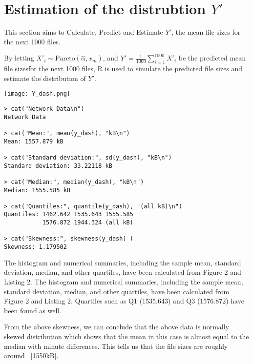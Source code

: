 \documentclass[11pt]{article}
\begin{document}
\section{Estimation of the distrubtion $Y'$}
This section aims to Calculate, Predict and Estimate $Y'$, the mean file sizes for the next 1000 files.
\par By letting $X'_{i}\sim\text{Pareto}(\hat{\alpha},x_m)$, and $Y' = \frac{1}{1000}\sum_{i=1}^{1000}X'_{i}$ be the predicted mean file sizesfor the next 1000 files,
R is used to simulate the predicted file sizes and estimate the distribution of $Y'$.\\
\begin{minipage}{0.4\textwidth}
    \centering
    \texttt{[image: Y\_dash.png]}
\end{minipage}%
\begin{minipage}{0.4\textwidth}
    \centering
    \footnotesize
    \begin{lstlisting}[caption={Summary \& Standard Deviation},captionpos=b]
> cat("Network Data\n")
Network Data

> cat("Mean:", mean(y_dash), "kB\n")
Mean: 1557.879 kB

> cat("Standard deviation:", sd(y_dash), "kB\n")
Standard deviation: 33.22118 kB

> cat("Median:", median(y_dash), "kB\n")
Median: 1555.585 kB

> cat("Quantiles:", quantile(y_dash), "(all kB)\n")
Quantiles: 1462.642 1535.643 1555.585 
           1576.872 1944.324 (all kB)
           
> cat("Skewness:", skewness(y_dash) )
Skewness: 1.179502
    \end{lstlisting}
\end{minipage}
\par The histogram and numerical summaries, including the sample mean, standard deviation, median, and other quartiles, have been calculated from Figure 2 and Listing 2. The histogram and numerical summaries, including the sample mean, standard deviation, median, and other quartiles, have been calculated from Figure 2 and Listing 2. Quartiles such as Q1 (1535.643) and Q3 (1576.872) have been found as well.
\par From the above skewness, we can conclude that the above data is normally skewed distribution which shows that the mean in this case is almost equal to the median with minute differences. This tells us that the file sizes are roughly around ~[1550kB].
\end{document}
